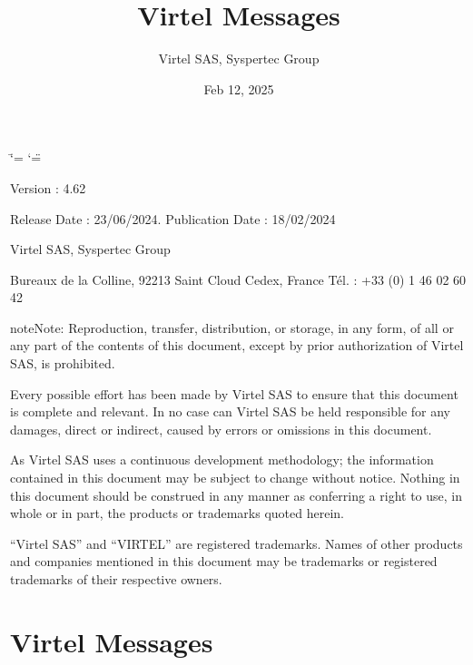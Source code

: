 \documentclass[letterpaper,10pt,english]{sphinxmanual}
\title{Virtel Messages}
\date{Feb 12, 2025}
\author{Virtel SAS, Syspertec Group}
\begin{document}
\ifdefined\shorthandoff
  \ifnum\catcode`\=\string=\active\shorthandoff{=}\fi
  \ifnum\catcode`\"=\active{}\fi
\fi

\pagestyle{empty}
\sphinxmaketitle
\pagestyle{plain}
\sphinxtableofcontents
\pagestyle{normal}
\label{\detokenize{messages::doc}}


\sphinxAtStartPar
{}

\sphinxAtStartPar
{}

\sphinxAtStartPar
Version : 4.62

\sphinxAtStartPar
Release Date : 23/06/2024. Publication Date : 18/02/2024

\sphinxAtStartPar
Virtel SAS, Syspertec Group

 Bureaux de la Colline, 92213 Saint Cloud Cedex, France Tél. : +33 (0) 1 46 02 60 42

\sphinxAtStartPar
{}

\begin{sphinxadmonition}{note}{Note:}
\sphinxAtStartPar
Reproduction, transfer, distribution, or storage, in any form, of all or any part of
the contents of this document, except by prior authorization of Virtel SAS, is prohibited.

\sphinxAtStartPar
Every possible effort has been made by Virtel SAS to ensure that this document
is complete and relevant. In no case can Virtel SAS be held responsible for
any damages, direct or indirect, caused by errors or omissions in this document.

\sphinxAtStartPar
As Virtel SAS uses a continuous development methodology; the information
contained in this document may be subject to change without notice. Nothing in this
document should be construed in any manner as conferring a right to use, in whole or in
part, the products or trademarks quoted herein.

\sphinxAtStartPar
“Virtel SAS” and “VIRTEL” are registered trademarks. Names of other products
and companies mentioned in this document may be trademarks or registered trademarks of
their respective owners.
\end{sphinxadmonition}


\chapter{Virtel Messages}
\label{\detokenize{messages:virtel-messages}}\label{\detokenize{messages:v462mg-introduction}}
\end{document}
